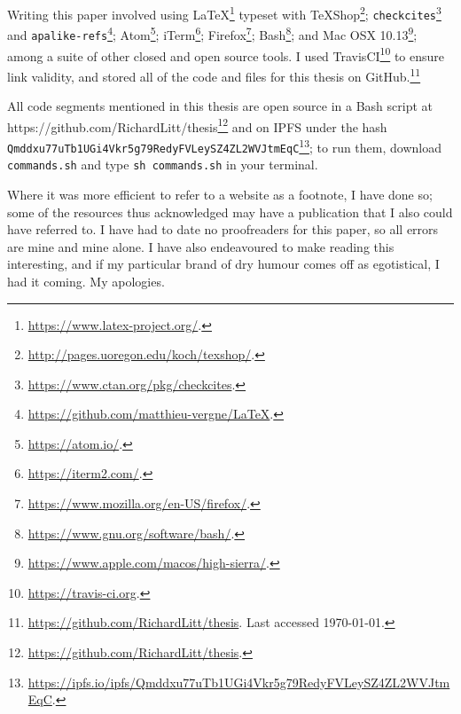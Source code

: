 Writing this paper involved using LaTeX\footnote{\href{https://www.latex-project.org/}{https://www.latex-project.org/}. } typeset with TeXShop\footnote{\href{http://pages.uoregon.edu/koch/texshop/}{http://pages.uoregon.edu/koch/texshop/}. };
{\tt checkcites}\footnote{\href{https://www.ctan.org/pkg/checkcites}{https://www.ctan.org/pkg/checkcites}. } and {\tt apalike-refs}\footnote{\href{https://github.com/matthieu-vergne/LaTeX}{https://github.com/matthieu-vergne/LaTeX}. }; Atom\footnote{\href{https://atom.io/}{https://atom.io/}. }; iTerm\footnote{\href{https://iterm2.com/}{https://iterm2.com/}. }; Firefox\footnote{\href{https://www.mozilla.org/en-US/firefox/}{https://www.mozilla.org/en-US/firefox/}. }; Bash\footnote{\href{https://www.gnu.org/software/bash/}{https://www.gnu.org/software/bash/}. }; and Mac OSX 10.13\footnote{\href{https://www.apple.com/macos/high-sierra/}{https://www.apple.com/macos/high-sierra/}. }; among a suite of other closed and open source tools. I used TravisCI\footnote{\href{https://travis-ci.org}{https://travis-ci.org}. } to ensure link validity, and stored all of the code and files for this thesis on GitHub.\footnote{\href{https://github.com/RichardLitt/thesis}{https://github.com/RichardLitt/thesis}. Last accessed \today.}

All code segments mentioned in this thesis are open source in a Bash script at https://github.com/RichardLitt/thesis\footnote{\href{https://github.com/RichardLitt/thesis}{https://github.com/RichardLitt/thesis}. } and on IPFS under the hash {\tt Qmddxu77uTb1UGi4Vkr5\-g79RedyFVLeySZ4ZL\-2WVJtmEqC}\footnote{\href{https://ipfs.io/ipfs/Qmddxu77uTb1UGi4Vkr5g79RedyFVLeySZ4ZL2WVJtmEqC}{https://ipfs.io/ipfs/Qmddxu77uTb1UGi4Vkr5g79RedyFVLeySZ4ZL2WVJtmEqC}. }; to run them, download {\tt commands.sh} and type {\tt sh commands.sh} in your terminal.

Where it was more efficient to refer to a website as a footnote, I have done so; some of the resources thus acknowledged may have a publication that I also could have referred to. I have had to date no proofreaders for this paper, so all errors are mine and mine alone. I have also endeavoured to make reading this interesting, and if my particular brand of dry humour comes off as egotistical, I had it coming. My apologies.